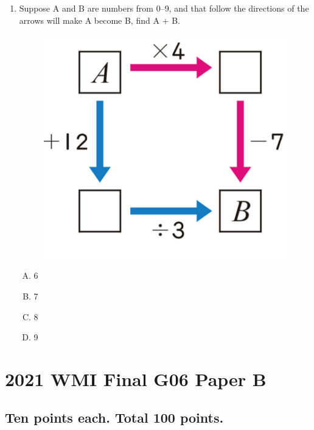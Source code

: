 \documentclass[12pt]{scrartcl}
\begin{document}
\begin{enumerate}[resume]
\item Suppose A and B are numbers from 0--9, and that follow the directions of the arrows will make A become B, find A + B.
\begin{figure}[h]
    \centering
    \includegraphics{StarGen/0Figure/wmi-2020-6a-diagram-operation.png}
\end{figure}
\begin{enumerate}[(A)]
    \item 6 \item 7 \item 8 \item 9
\end{enumerate}
\end{enumerate}

\section*{2021 WMI Final G06 Paper B}

\subsection*{Ten points each. Total 100 points.}
\end{document}
